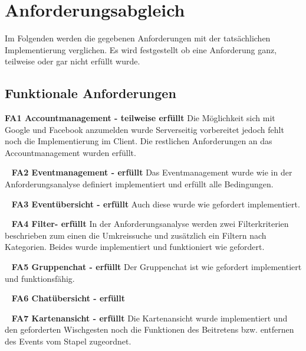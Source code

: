 \documentclass{scrartcl}
\begin{document}
\section{Anforderungsabgleich}

Im Folgenden werden die gegebenen Anforderungen mit der tatsächlichen
Implementierung verglichen. Es wird festgestellt ob eine Anforderung ganz,
teilweise oder gar nicht erfüllt wurde.

\subsection{Funktionale Anforderungen}

\textbf{FA1 Accountmanagement - teilweise erfüllt} \newline
Die Möglichkeit sich mit Google und  Facebook anzumelden wurde Serverseitig vorbereitet jedoch fehlt noch die Implementierung im Client. Die restlichen Anforderungen an das Accountmanagement wurden erfüllt.

\ \newline
\textbf{FA2 Eventmanagement - erfüllt} \newline
Das Eventmanagement wurde wie in der Anforderungsanalyse definiert implementiert und erfüllt alle Bedingungen.

\ \newline
\textbf{FA3 Eventübersicht - erfüllt} \newline
Auch diese wurde wie gefordert implementiert.

\ \newline
\textbf{FA4 Filter- erfüllt} \newline
In der Anforderungsanalyse werden zwei Filterkriterien beschrieben zum einen die Umkreissuche und zusätzlich ein Filtern nach Kategorien. Beides wurde implementiert und funktioniert wie gefordert.

\ \newline
\textbf{FA5 Gruppenchat - erfüllt} \newline
Der Gruppenchat ist wie gefordert implementiert und funktionsfähig.

\ \newline
\textbf{FA6 Chatübersicht - erfüllt} \newline

\ \newline
\textbf{FA7 Kartenansicht - erfüllt} \newline
Die Kartenansicht wurde implementiert und den geforderten Wischgesten noch die Funktionen des Beitretens bzw. entfernen des Events vom Stapel zugeordnet.
\end{document}
